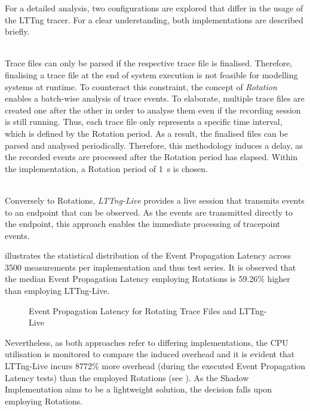         For a detailed analysis, two configurations are explored that differ in the usage of the LTTng tracer. For a clear understanding, both implementations are described briefly.
        \begin{description}[leftmargin=.5cm,itemsep=.4em]
            \item[Rotate Trace Files] \hfill \\
                Trace files can only be parsed if the respective trace file is finalised. Therefore, finalising a trace file at the end of system execution is not feasible for modelling systems at runtime. To counteract this constraint, the concept of \emph{Rotation} enables a batch-wise analysis of trace events. To elaborate, multiple trace files are created one after the other in order to analyse them even if the recording session is still running. Thus, each trace file only represents a specific time interval, which is defined by the Rotation period. As a result, the finalised files can be parsed and analysed periodically. Therefore, this methodology induces a delay, as the recorded events are processed after the Rotation period has elapsed. Within the implementation, a Rotation period of 1~s is chosen.
            \item[LTTng-Live] \hfill \\
                Conversely to Rotations, \emph{LTTng-Live} provides a live session that transmits events to an endpoint that can be observed. As the events are transmitted directly to the endpoint, this approach enables the immediate processing of tracepoint events.
        \end{description}

         illustrates the statistical distribution of the Event Propagation Latency across 3500 measurements per implementation and thus test series.
        It is observed that the median Event Propagation Latency employing Rotations is 59.26\% higher than employing LTTng-Live.
        \begin{figure}[h]
            \centering
            
            \caption[Latency from Initialisation to Requesting Client]{Event Propagation Latency for Rotating Trace Files and LTTng-Live} \label{fig:tikz:eval:eventProbLatency}
        \end{figure}

        Nevertheless, as both approaches refer to differing implementations, the CPU utilisation is monitored to compare the induced overhead and it is evident that LTTng-Live incurs 8772\% more overhead (during the executed Event Propagation Latency tests) than the employed Rotations (see ).\newline
        As the Shadow Implementation aims to be a lightweight solution, the decision falls upon employing Rotations.

